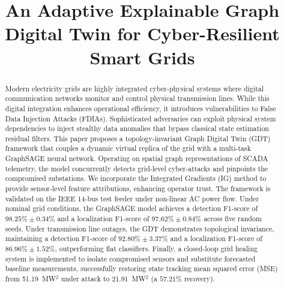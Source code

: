 \documentclass[conference]{IEEEtran}
\begin{document}
\title{An Adaptive Explainable Graph Digital Twin for Cyber-Resilient Smart Grids}

\author{
}

\maketitle

\begin{abstract}
Modern electricity grids are highly integrated cyber-physical systems where digital communication networks monitor and control physical transmission lines. While this digital integration enhances operational efficiency, it introduces vulnerabilities to False Data Injection Attacks (FDIAs). Sophisticated adversaries can exploit physical system dependencies to inject stealthy data anomalies that bypass classical state estimation residual filters. This paper proposes a topology-invariant Graph Digital Twin (GDT) framework that couples a dynamic virtual replica of the grid with a multi-task GraphSAGE neural network. Operating on spatial graph representations of SCADA telemetry, the model concurrently detects grid-level cyber-attacks and pinpoints the compromised substations. We incorporate the Integrated Gradients (IG) method to provide sensor-level feature attributions, enhancing operator trust. The framework is validated on the IEEE 14-bus test feeder under non-linear AC power flow. Under nominal grid conditions, the GraphSAGE model achieves a detection F1-score of $98.25\% \pm 0.34\%$ and a localization F1-score of $97.62\% \pm 0.84\%$ across five random seeds. Under transmission line outages, the GDT demonstrates topological invariance, maintaining a detection F1-score of $92.80\% \pm 3.37\%$ and a localization F1-score of $86.96\% \pm 1.52\%$, outperforming flat classifiers. Finally, a closed-loop grid healing system is implemented to isolate compromised sensors and substitute forecasted baseline measurements, successfully restoring state tracking mean squared error (MSE) from 51.19~MW$^2$ under attack to 21.91~MW$^2$ (a $57.21\%$ recovery).
\end{abstract}
\end{document}
